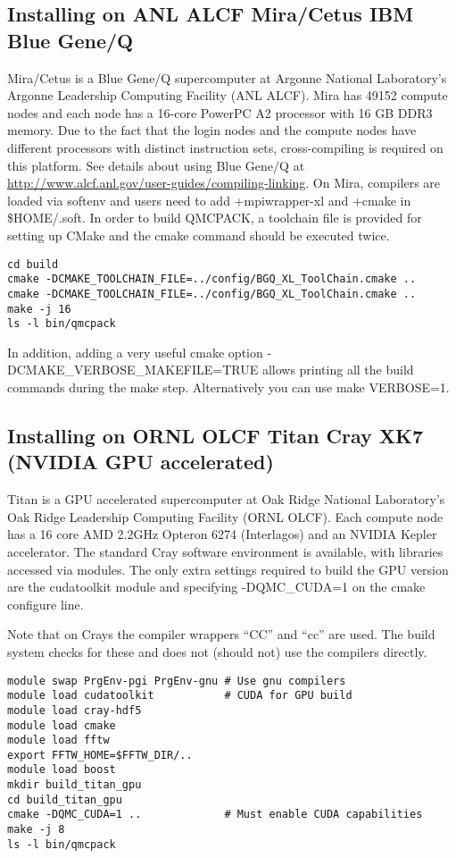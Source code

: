 \subsection{Installing on ANL ALCF Mira/Cetus IBM Blue Gene/Q}
\label{sec:buildbgq}
Mira/Cetus is a Blue Gene/Q supercomputer at Argonne National Laboratory's Argonne Leadership Computing Facility (ANL ALCF). Mira has 49152 compute nodes and each node has a 16-core PowerPC A2 processor with 16 GB DDR3 memory. Due to the fact that the login nodes and the compute nodes have different processors with distinct instruction sets, cross-compiling is required on this platform. See details about using Blue Gene/Q at \url{http://www.alcf.anl.gov/user-guides/compiling-linking}. On Mira, compilers are loaded via softenv and users need to add +mpiwrapper-xl and +cmake in \$HOME/.soft. In order to build QMCPACK, a toolchain file is provided for setting up CMake and the cmake command should be executed twice.

\begin{verbatim}
cd build
cmake -DCMAKE_TOOLCHAIN_FILE=../config/BGQ_XL_ToolChain.cmake ..
cmake -DCMAKE_TOOLCHAIN_FILE=../config/BGQ_XL_ToolChain.cmake ..
make -j 16
ls -l bin/qmcpack
\end{verbatim}

In addition, adding a very useful cmake option
-DCMAKE\_VERBOSE\_MAKEFILE=TRUE allows printing all the build commands
during the make step. Alternatively you can use make VERBOSE=1.

\subsection{Installing on ORNL OLCF Titan Cray XK7 (NVIDIA GPU
  accelerated)}
\label{sec:titanbuildgpu}
Titan is a GPU accelerated supercomputer at Oak Ridge National
Laboratory's  Oak Ridge Leadership Computing Facility  (ORNL OLCF). Each
compute node has a 16 core AMD 2.2GHz Opteron 6274 (Interlagos) and an
NVIDIA Kepler accelerator. The standard Cray software environment is
available, with libraries accessed via modules. The only extra
settings required to build the GPU version are the cudatoolkit module
and specifying -DQMC\_CUDA=1 on the cmake configure line.

Note that on Crays the compiler wrappers ``CC'' and ``cc'' are 
used. The build system checks for these and does not (should not) use
the compilers directly.

\begin{verbatim}
module swap PrgEnv-pgi PrgEnv-gnu # Use gnu compilers
module load cudatoolkit           # CUDA for GPU build
module load cray-hdf5
module load cmake
module load fftw
export FFTW_HOME=$FFTW_DIR/..
module load boost
mkdir build_titan_gpu
cd build_titan_gpu
cmake -DQMC_CUDA=1 ..             # Must enable CUDA capabilities
make -j 8
ls -l bin/qmcpack 
\end{verbatim}

